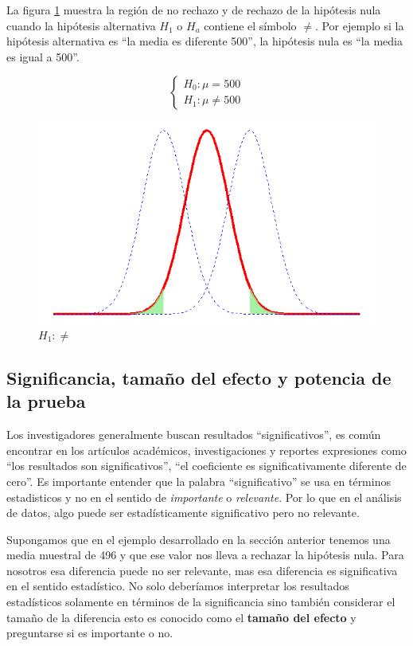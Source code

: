 \documentclass[letterpaper,]{book}
\begin{document}
La figura \ref{fig:ph2c} muestra la región de no rechazo y de rechazo de la hipótesis nula cuando la hipótesis alternativa \(H_1\) o \(H_a\) contiene el símbolo \(\neq\). Por ejemplo si la hipótesis alternativa es ``la media es diferente 500'', la hipótesis nula es ``la media es igual a 500''.

\begin{equation} 
\begin{cases} 
H_0: \mu =  500 \\ 
H_1: \mu \neq 500
\end{cases} 
\end{equation}

\begin{figure}[!h]

{\centering \includegraphics[width=0.6\linewidth]{ph2c} 

}

\caption{$H_1:\neq$}\label{fig:ph2c}
\end{figure}

\hypertarget{significancia-tamano-del-efecto-y-potencia-de-la-prueba}{%
\subsection{Significancia, tamaño del efecto y potencia de la prueba}\label{significancia-tamano-del-efecto-y-potencia-de-la-prueba}}

Los investigadores generalmente buscan resultados ``significativos'', es común encontrar en los artículos académicos, investigaciones y reportes expresiones como ``los resultados son significativos'', ``el coeficiente es significativamente diferente de cero''. Es importante entender que la palabra ``significativo'' se usa en términos estadisticos y no en el sentido de \emph{importante} o \emph{relevante}. Por lo que en el análisis de datos, algo puede ser estadísticamente significativo pero no relevante.

Supongamos que en el ejemplo desarrollado en la sección anterior tenemos una media muestral de 496 y que ese valor nos lleva a rechazar la hipótesis nula. Para nosotros esa diferencia puede no ser relevante, mas esa diferencia es significativa en el sentido estadístico. No solo deberíamos interpretar los resultados estadísticos solamente en términos de la significancia sino también considerar el tamaño de la diferencia esto es conocido como el \textbf{tamaño del efecto} y preguntarse si es importante o no.
\end{document}
